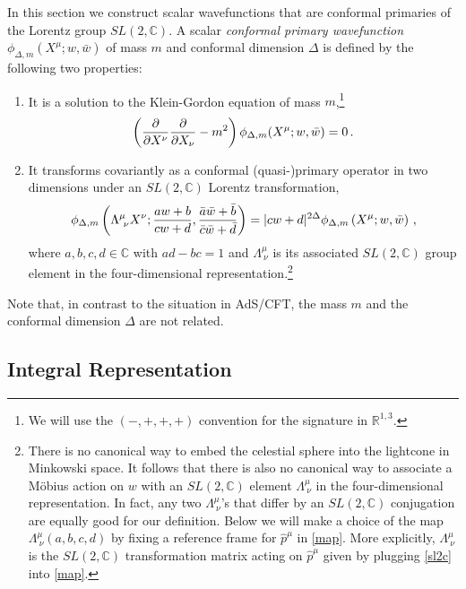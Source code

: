 \documentclass[12pt]{article}
\numberwithin{equation}{section}
\begin{document}
In this section we construct  scalar wavefunctions that are conformal primaries of the Lorentz group $SL(2,\mathbb{C})$. 
A scalar \textit{conformal primary wavefunction} $\phi_{\Delta,m}(X^\mu; w,\bar w)$ of mass $m$ and conformal dimension $\Delta$ is defined by the following two properties:
\begin{enumerate}
\item It is a solution to the  Klein-Gordon equation of mass $m$,\footnote{We will use the $(-,+,+,+)$ convention for the signature in $\mathbb{R}^{1,3}$.}
\begin{align}
\left({\partial \over \partial X^\nu}{\partial \over \partial X_\nu} -m^2\right) \phi_{\Delta,m}(X^\mu;w,\bar w)=0\,.
\end{align}
\item It transforms covariantly as a conformal (quasi-)primary operator in two dimensions under an $SL(2,\mathbb{C})$ Lorentz transformation,
\begin{align}\label{highestweight}
\phi_{\Delta,m}\left( \Lambda^\mu_{~\nu} X^\nu ; {aw+b\over cw+d} , {\bar a \bar w+ \bar b \over \bar c\bar w+ \bar d}\right)
= |cw+d|^{2\Delta}\phi_{\Delta,m}\left( X^\mu ; w,\bar w\right)\,,
\end{align}
where $a,b,c,d\in \mathbb{C}$ with $ad-bc=1$ and $\Lambda^\mu_{~\nu}$ is its associated $SL(2,\mathbb{C})$ group element in the four-dimensional representation.\footnote{There is no canonical way to embed the celestial sphere into the lightcone in Minkowski space.  It follows that there is also no canonical way to associate a  M\"obius action on $w$ with an $SL(2,\mathbb{C})$ element $\Lambda^\mu_{~\nu}$ in the four-dimensional representation. In fact, any two $\Lambda^\mu_{~\nu}$'s that differ by an $SL(2,\mathbb{C})$ conjugation are equally good for our definition. 
  Below  we will make a choice of the map $\Lambda^\mu_{~\nu}(a,b,c,d)$ by fixing a reference frame for  $\hat p^\mu$ in \eqref{map}. More explicitly, $\Lambda^\mu_{~\nu}$ is the $SL(2,\mathbb{C})$ transformation matrix acting on $\hat p^\mu$ given by plugging \eqref{sl2c} into \eqref{map}.}

\end{enumerate}
Note that, in contrast to the situation in AdS/CFT, the mass $m$ and the conformal dimension $\Delta$ are not  related.


\subsection{Integral Representation}
\end{document}
